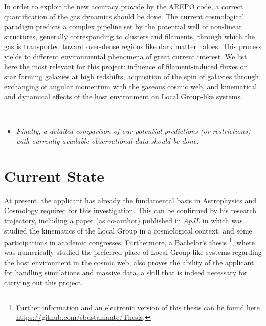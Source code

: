 \documentclass[a4,useAMS,usenatbib,usegraphicx,12pt]{article}
\begin{document}
In order to exploit the new accuracy provide by the AREPO code, a correct 
quantification of the gas dynamics should be done. The current cosmological 
paradigm predicts a complex pipeline set by the potential well of non-linear 
structures, generally corresponding to clusters and filaments, through which 
the gas is transported toward over-dense regions like dark matter haloes. This
process yields to different environmental phenomena of great current interest.
We list here the most relevant for this project: influence of filament-induced 
fluxes on star forming galaxies at high redshifts, acquisition of the spin of 
galaxies through exchanging of angular momentum with the gaseous cosmic web, 
and kinematical and dynamical effects of the host environment on Local 
Group-like systems.

\

\begin{itemize}

\item[\checkmark] \textit{Finally, a detailed comparison of our potential 
predictions (or restrictions) with currently available observational data
should be done.}

\end{itemize}



\section{Current State}


At present, the applicant has already the fundamental basis in Astrophysics and
Cosmology required for this investigation. This can be confirmed by his research 
trajectory, including a paper (as co-author) published in \textit{ApJL} in which 
was studied the kinematics of the Local Group in a cosmological context, and some
participations in academic congresses. Furthermore, a Bachelor's thesis
\footnote{Further information and an electronic version of this 
thesis can be found here \url{https://github.com/sbustamante/Thesis}.}, where was 
numerically studied the preferred place of Local Group-like systems regarding the 
host environment in the cosmic web, also proves the ability of the applicant for
handling simulations and massive data, a skill that is indeed necessary for 
carrying out this project.
\end{document}
